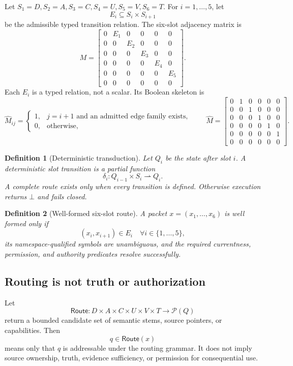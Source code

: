 \documentclass[11pt]{article}
\newtheorem{definition}{Definition}
\newcommand{\Route}{\mathsf{Route}}
\newcommand{\botstate}{\bot}
\begin{document}
Let \(S_1=D,S_2=A,S_3=C,S_4=U,S_5=V,S_6=T\). For \(i=1,\ldots,5\), let
\[
E_i\subseteq S_i\times S_{i+1}
\]
be the admissible typed transition relation. The six-slot adjacency matrix is
\[
M=
\begin{bmatrix}
0&E_1&0&0&0&0\\
0&0&E_2&0&0&0\\
0&0&0&E_3&0&0\\
0&0&0&0&E_4&0\\
0&0&0&0&0&E_5\\
0&0&0&0&0&0
\end{bmatrix}.
\]
Each \(E_i\) is a typed relation, not a scalar. Its Boolean skeleton is
\[
\widehat{M}_{ij}=
\begin{cases}
1,&j=i+1\text{ and an admitted edge family exists},\\
0,&\text{otherwise},
\end{cases}
\qquad
\widehat M=
\begin{bmatrix}
0&1&0&0&0&0\\
0&0&1&0&0&0\\
0&0&0&1&0&0\\
0&0&0&0&1&0\\
0&0&0&0&0&1\\
0&0&0&0&0&0
\end{bmatrix}.
\]

\begin{definition}[Deterministic transduction]
Let \(Q_i\) be the state after slot \(i\). A deterministic slot transition is a partial function
\[
\delta_i:Q_{i-1}\times S_i\rightharpoonup Q_i.
\]
A complete route exists only when every transition is defined. Otherwise execution returns \(\botstate\) and fails closed.
\end{definition}

\begin{definition}[Well-formed six-slot route]
A packet \(x=(x_1,\ldots,x_6)\) is well formed only if \[
(x_i,x_{i+1})\in E_i\quad\forall i\in\{1,\ldots,5\},
\]
its namespace-qualified symbols are unambiguous, and the required currentness, permission, and authority predicates resolve successfully.
\end{definition}

\subsection{Routing is not truth or authorization}

Let
\[
\Route:D\times A\times C\times U\times V\times T\to\mathcal{P}(Q)
\]
return a bounded candidate set of semantic stems, source pointers, or capabilities. Then
\[
q\in\Route(x)
\]
means only that \(q\) is addressable under the routing grammar. It does not imply source ownership, truth, evidence sufficiency, or permission for consequential use.
\end{document}
